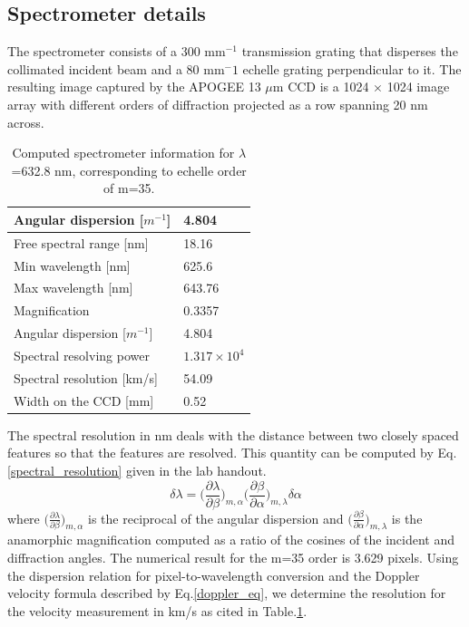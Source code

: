 \documentclass[authoryear, 12pt,5p, times]{elsarticle}
\begin{document}
\subsection{Spectrometer details}
The spectrometer consists of a 300 mm$^{-1}$ transmission grating that disperses the collimated incident beam and a 80 mm${^-1}$ echelle grating  perpendicular to it. The resulting image captured by the APOGEE 13 $\mu$m CCD is a 1024 $\times$ 1024 image array with different orders of diffraction projected as a row spanning 20 nm across. 
\hspace{-20pt}
\begin{table}[h!]
    \begin{tabular}{|l|l|}
    \hline Angular dispersion [$m^{-1}$]  & 4.804                     \\      \hline Free spectral range [nm]           & 18.16                     \\     \hline Min wavelength [nm]  & 625.6
 \\  \hline  Max wavelength [nm]  &  643.76 
 \\ \hline Magnification   & 0.3357                
 \\ \hline       Angular dispersion [$m^{-1}$]  & 4.804                   \\ \hline   Spectral resolving power  & $1.317\times10^4$\\ 
    \hline Spectral resolution [km/s]   & 54.09        \\ 
   \hline Width on the CCD [mm]   & 0.52                      \\ \hline
    \end{tabular}
  
    \caption{Computed spectrometer information for $\lambda $=632.8 nm, corresponding to echelle order of  m=35. }
  \label{spec_prop}\end{table}

The spectral resolution in nm deals with the distance between two closely spaced features so that the features are resolved. This quantity can be computed by Eq. \ref{spectral_resolution} given in the lab handout.
\begin{equation}
\label{spectral_resolution}
\delta\lambda=\Bigg(\frac{\partial\lambda}{\partial\beta}\Bigg)_{m,\alpha}\Bigg(\frac{\partial\beta}{\partial\alpha}\Bigg)_{m,\lambda}\delta\alpha
\end{equation}
where $\Big(\frac{\partial\lambda}{\partial\beta}\Big)_{m,\alpha}$ is the reciprocal of the angular dispersion and $\Big(\frac{\partial\beta}{\partial\alpha}\Big)_{m,\lambda}$ is the anamorphic magnification computed as a ratio of the cosines of the incident and diffraction angles. The numerical result for the m=35 order is 3.629 pixels. Using the dispersion relation for pixel-to-wavelength conversion and the Doppler velocity formula described by Eq.\ref{doppler_eq}, we determine the resolution for the velocity measurement in km/s as cited in Table.\ref{spec_prop}.
\end{document}
